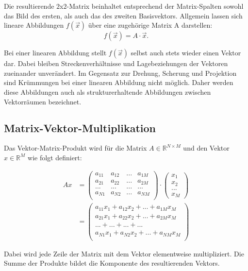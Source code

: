 Die resultierende $2$x$2$-Matrix beinhaltet entsprechend der Matrix-Spalten sowohl das Bild des ersten, als auch das des zweiten Basisvektors. Allgemein lassen sich lineare Abbildungen $f(\vec{x})$ über eine zugehörige Matrix A darstellen:
\begin{equation}
f(\vec{x}) = A \cdot \vec{x}.
\end{equation}

Bei einer linearen Abbildung stellt $f(\vec{x})$ selbst auch stets wieder einen Vektor dar. Dabei bleiben Streckenverhältnisse und Lagebeziehungen der Vektoren zueinander unverändert. Im Gegensatz zur Drehung, Scherung und Projektion sind Krümmungen bei einer linearen Abbildung nicht möglich. Daher werden diese Abbildungen auch als strukturerhaltende Abbildungen zwischen Vektorräumen bezeichnet.

\subsection{Matrix-Vektor-Multiplikation}

Das Vektor-Matrix-Produkt wird für die Matrix $A \in \mathbb{R}^{N \times M}$ und den Vektor $x \in \mathbb{R}^M$ wie folgt definiert:

\begin{equation}
  \begin{aligned}
    Ax &= \begin{pmatrix}
      a_{11} & a_{12} & ... & a_{1M} \\ 
      a_{21} & a_{22} & ... & a_{2M} \\ 
      ... & ... & ... & ... \\ 
      a_{N1} & a_{N2} & ... & a_{NM} \\ 
    \end{pmatrix}
    \cdot 
    \begin{pmatrix}
      x_1 \\ x_2 \\ ... \\ x_M
    \end{pmatrix} \\[2ex]
    &=  \begin{pmatrix}
      a_{11}x_1 + a_{12}x_2 +... + a_{1M}x_M \\ 
      a_{21}x_1 + a_{22}x_2 + ... + a_{2M}x_M \\ 
      ... + ... + ... + ... \\ 
      a_{N1}x_1 + a_{N2}x_2 + ... + a_{NM}x_M \\ 
    \end{pmatrix}
  \end{aligned}
\end{equation}

Dabei wird jede Zeile der Matrix mit dem Vektor elementweise multipliziert. Die Summe der Produkte bildet die Komponente des resultierenden Vektors.
